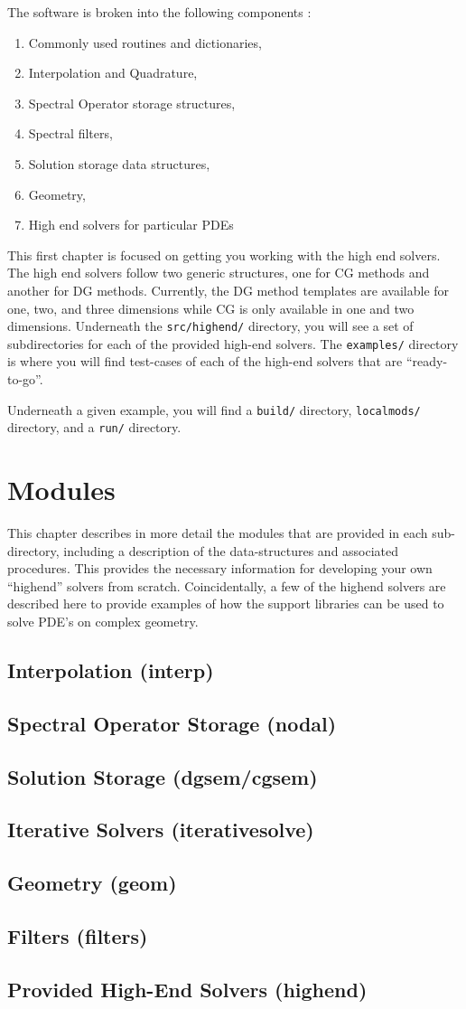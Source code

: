 \documentclass[12pt]{softwaremanual}
\begin{document}
The software is broken into the following components :
\begin{enumerate}
\item Commonly used routines and dictionaries,
\item Interpolation and Quadrature,
\item Spectral Operator storage structures,
\item Spectral filters,
\item Solution storage data structures,
\item Geometry,
\item High end solvers for particular PDEs
\end{enumerate}

This first chapter is focused on getting you working with the high end solvers. The high end solvers follow two generic structures, one for CG methods and another for DG methods. Currently, the DG method templates are available for one, two, and three dimensions while CG is only available in one and two dimensions. Underneath the \texttt{src/highend/} directory, you will see a set of subdirectories for each of the provided high-end solvers. The \texttt{examples/} directory is where you will find test-cases of each of the high-end solvers that are ``ready-to-go''.

 Underneath a given example, you will find a \texttt{build/} directory, \texttt{localmods/} directory, and a \texttt{run/} directory.

\chapter{Modules}
This chapter describes in more detail the modules that are provided in each sub-directory, including a description of the data-structures and associated procedures. This provides the necessary information for developing your own ``highend'' solvers from scratch. Coincidentally, a few of the highend solvers are described here to provide examples of how the support libraries can be used to solve PDE's on complex geometry.

\section{Interpolation (interp)}
\section{Spectral Operator Storage (nodal)}
\section{Solution Storage (dgsem/cgsem)}
\section{Iterative Solvers (iterativesolve) }
\section{Geometry (geom)}
\section{Filters (filters) }
\section{Provided High-End Solvers (highend)}
\end{document}

